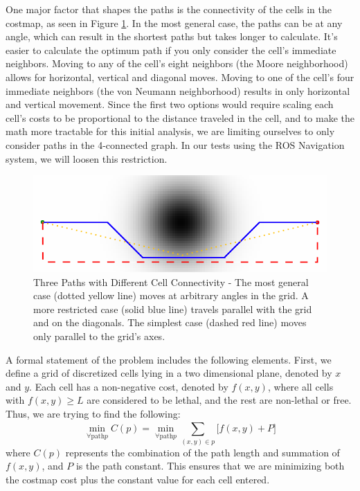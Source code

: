 One major factor that shapes the paths is the connectivity of the cells in the costmap, as seen in Figure \ref{fig:connectedness}. In the most general case, the paths can be at any angle, which can result in the shortest paths but takes longer to calculate. It's easier to calculate the optimum path if you only consider the cell's immediate neighbors. Moving to any of the cell's eight neighbors (the Moore neighborhood) allows for horizontal, vertical and diagonal moves. Moving to one of the cell's four immediate neighbors (the von Neumann neighborhood) results in only horizontal and vertical movement. Since the first two options would require scaling each cell's costs to be proportional to the distance traveled in the cell, and to make the math more tractable for this initial analysis, we are limiting ourselves to only consider paths in the 4-connected graph. In our tests using the ROS Navigation system, we will loosen this restriction. 

\begin{figure}
\includegraphics[width=\columnwidth]{graphix/connectedness.png}
\caption{Three Paths with Different Cell Connectivity - The most general case (dotted yellow line) moves at arbitrary angles in the grid. A more restricted case (solid blue line) travels parallel with the grid and on the diagonals. The simplest case (dashed red line) moves only parallel to the grid's axes. }
\label{fig:connectedness}
\end{figure}

A formal statement of the problem includes the following elements. First, we define a grid of discretized cells lying in a two dimensional plane, denoted by $x$ and $y$. Each cell has a non-negative cost, denoted by $f(x,y)$, where all cells with $f(x,y)\ge L$ are considered to be lethal, and the rest are non-lethal or free. Thus, we are trying to find the following:
\begin{equation}
   \displaystyle
 \min_{\forall \mathrm{path} p} C(p) = \min_{\forall \mathrm{path} p} \sum\limits_{(x,y) \in p}^{} \Big[ f(x,y) + P \Big] 
 \end{equation}
where $C(p)$ represents the combination of the path length and summation of $f(x,y)$, and $P$ is the path constant. This ensures that we are minimizing both the costmap cost plus the constant value for each cell entered.

